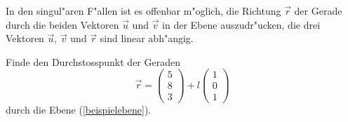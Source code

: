 In den singul"aren F"allen ist es offenbar m"oglich, die Richtung $\vec r$
der Gerade durch die beiden Vektoren $\vec u$ und $\vec v$ in der Ebene
auszudr"ucken, die drei Vektoren $\vec u$, $\vec v$ und $\vec r$ sind
linear abh"angig.

\begin{beispiel}
Finde den Durchstosspunkt der Geraden
\[
\vec r=
\begin{pmatrix} 5\\8\\3 \end{pmatrix}
+
l\begin{pmatrix} 1\\0\\1 \end{pmatrix}
\]
durch die Ebene (\ref{beispielebene}). 

\smallskip


\end{beispiel}
